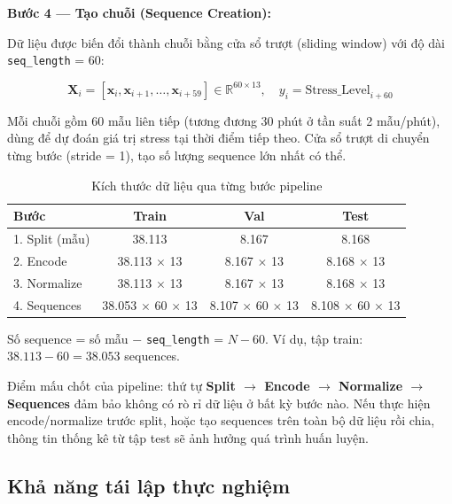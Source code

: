 \textbf{Bước 4 — Tạo chuỗi (Sequence Creation):}

Dữ liệu được biến đổi thành chuỗi bằng cửa sổ trượt (sliding window) với độ dài \texttt{seq\_length} = 60:

\begin{equation}
\label{eq:sequences}
\mathbf{X}_i = [\mathbf{x}_{i}, \mathbf{x}_{i+1}, \ldots, \mathbf{x}_{i+59}] \in \mathbb{R}^{60 \times 13}, \quad y_i = \text{Stress\_Level}_{i+60}
\end{equation}

\noindent Mỗi chuỗi gồm 60 mẫu liên tiếp (tương đương 30 phút ở tần suất 2 mẫu/phút), dùng để dự đoán giá trị stress tại thời điểm tiếp theo. Cửa sổ trượt di chuyển từng bước (stride = 1), tạo số lượng sequence lớn nhất có thể.

\begin{table}[H]
\centering
\caption{Kích thước dữ liệu qua từng bước pipeline}
\label{tab:pipeline_sizes}
\small
\begin{tabular}{|l|c|c|c|}
\hline
\textbf{Bước} & \textbf{Train} & \textbf{Val} & \textbf{Test} \\
\hline
1. Split (mẫu)     & 38.113 & 8.167 & 8.168 \\
2. Encode           & 38.113 $\times$ 13 & 8.167 $\times$ 13 & 8.168 $\times$ 13 \\
3. Normalize        & 38.113 $\times$ 13 & 8.167 $\times$ 13 & 8.168 $\times$ 13 \\
4. Sequences        & 38.053 $\times$ 60 $\times$ 13 & 8.107 $\times$ 60 $\times$ 13 & 8.108 $\times$ 60 $\times$ 13 \\
\hline
\end{tabular}
\end{table}

Số sequence = số mẫu $- $ \texttt{seq\_length} = $N - 60$. Ví dụ, tập train: $38.113 - 60 = 38.053$ sequences.

Điểm mấu chốt của pipeline: thứ tự \textbf{Split $\rightarrow$ Encode $\rightarrow$ Normalize $\rightarrow$ Sequences} đảm bảo không có rò rỉ dữ liệu ở bất kỳ bước nào. Nếu thực hiện encode/normalize trước split, hoặc tạo sequences trên toàn bộ dữ liệu rồi chia, thông tin thống kê từ tập test sẽ ảnh hưởng quá trình huấn luyện.

\subsection{Khả năng tái lập thực nghiệm}
\label{subsec:reproducibility}

